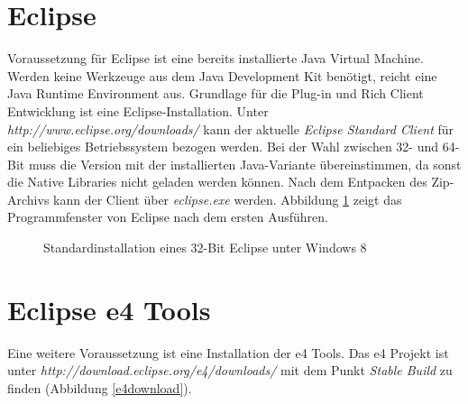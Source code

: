 \section{Eclipse}
Voraussetzung für Eclipse ist eine bereits installierte Java Virtual Machine. Werden keine Werkzeuge aus dem Java Development Kit benötigt, reicht eine Java Runtime Environment aus.
Grundlage für die Plug-in und Rich Client Entwicklung ist eine Eclipse-Installation. Unter \textit{http://www.eclipse.org/downloads/} kann der aktuelle \textit{Eclipse Standard Client} für ein beliebiges Betriebssystem bezogen werden. Bei der Wahl zwischen 32- und 64-Bit muss die Version mit der installierten Java-Variante übereinstimmen, da sonst die Native Libraries nicht geladen werden können. Nach dem Entpacken des Zip-Archivs kann der Client über \textit{eclipse.exe} werden. Abbildung \ref{eclipsestd} zeigt das Programmfenster von Eclipse nach dem ersten Ausführen.\\

\begin{figure}[H]
  \vspace{0.5cm}
  \centering
  \caption{Standardinstallation eines 32-Bit Eclipse unter Windows 8}
  \label{eclipsestd}
  \vspace{0.5cm}
\end{figure}

\section{Eclipse e4 Tools}
Eine weitere Voraussetzung ist eine Installation der e4 Tools. Das e4 Projekt ist unter \textit{http://download.eclipse.org/e4/downloads/} mit dem Punkt \textit{Stable Build} zu finden (Abbildung \ref{e4download}). 

